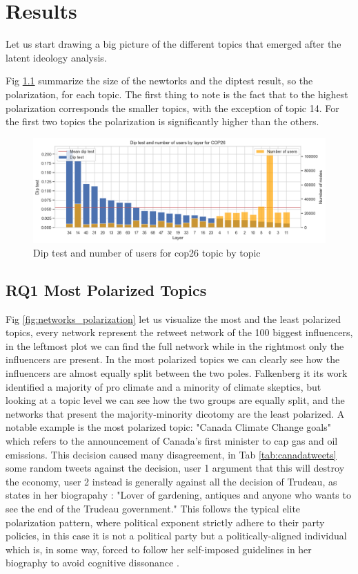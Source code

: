 \chapter{Results}%
\label{ch:res}
Let us start drawing a big picture of the different topics that emerged after the latent ideology analysis. 


Fig \ref{fig:diptest} summarize the size of the newtorks and the diptest result, so the polarization, for each topic. The first thing to note is the fact that to the highest polarization corresponds the smaller topics, with the exception of topic 14. For the first two topics the polarization is significantly higher than the others.


\begin{figure}[H]
    \centering
    \includegraphics[width=0.95\linewidth]{Chapter5//figures/diptest_cop26.png}
    \caption{Dip test and number of users for cop26 topic by topic}
    \label{fig:diptest}
\end{figure}

\section{RQ1 Most Polarized Topics}


Fig \ref{fig:networks_polarization} let us visualize the most and the least polarized topics, every network represent the retweet network of the 100 biggest influencers, in the leftmost plot we can find the full network while in the rightmost only the influencers are present. In the most polarized topics we can clearly see how the influencers are almost equally split between the two poles. Falkenberg it its work identified a majority of pro climate and a minority of climate skeptics, but looking at a topic level we can see how the two groups are equally split, and the networks that present the majority-minority dicotomy are the least polarized. A notable example is the most polarized topic: "Canada Climate Change goals" which refers to the announcement of Canada's first minister to cap gas and oil emissions. This decision caused many disagreement, in Tab \ref{tab:canadatweets} some random tweets against the decision, user 1 argument that this will destroy the economy, user 2 instead is generally against all the decision of Trudeau, as states in her biograpahy : "Lover of gardening, antiques and anyone who wants to see the end of the Trudeau government." This  follows the typical elite polarization pattern, where political exponent strictly adhere to their party policies, in this case it is not a political party but a politically-aligned individual which is, in some way, forced to follow her self-imposed guidelines in her biography to avoid cognitive dissonance \cite{Festinger_dissonance_57}.

